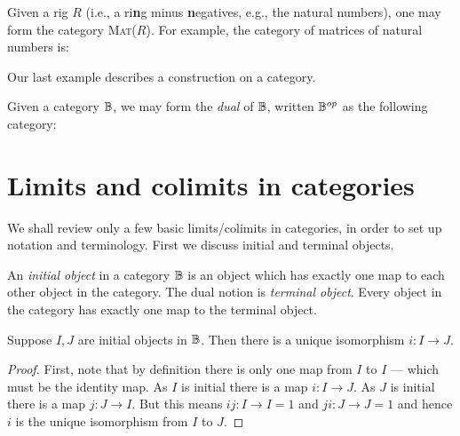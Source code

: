 \begin{example}\label{ex:matrix_category}
Given a rig $R$ (i.e., a ri\textbf{n}g minus \textbf{n}egatives, e.g., the natural numbers), one may
form the category \textsc{Mat}($R$). For example, the category of matrices of natural numbers is:
\end{example}

Our last example describes a construction on a category.

\begin{example}\label{ex:dual_category}
Given a category $\mathbb{B}$, we may form the \emph{dual} of $\mathbb{B}$, written $\mathbb{B}^{op}$ as the following
category:
\end{example}


\section{Limits and colimits in categories} %
\label{sub:limits_and_colimits_in_categories}

We shall review only a few basic limits/colimits in categories, in order to set up notation and
terminology. First we discuss initial and terminal objects.

\begin{definition}\label{def:initial_object}
  An \emph{initial object} in a category $\mathbb{B}$ is an object which has exactly one map to each other
  object in the category. The dual notion is \emph{terminal object}. Every object in the category
  has exactly one map to the terminal object.
\end{definition}


\begin{lemma}\label{lem:initial_objects_are_unique}
  Suppose $I,J$ are initial objects in $\mathbb{B}$. Then there is a unique isomorphism $i:I \to J$.
\end{lemma}
\begin{proof}
  First, note that by definition there is only one map from $I$ to $I$ --- which must be the
  identity map. As $I$ is initial there is a map $i: I \to J$. As $J$ is initial there is a map
  $j:J \to I$. But this means $i j : I \to I = 1$ and $j i : J \to J = 1$ and hence $i$ is the
  unique isomorphism from $I$ to $J$.
\end{proof}

